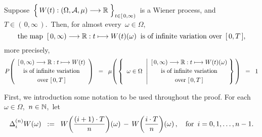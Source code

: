 
\vskip 0.5cm
\begin{theorem}
\label{WienerProcessHasInfiniteVariationSamplePaths}
\mbox{}
\vskip 0.2cm
\noindent
Suppose
\,$\left\{\,\overset{{\color{white}.}}{W}(t) : (\Omega,\mathcal{A},\mu) \longrightarrow \Re \;\right\}_{t \in[\,0,\infty)}$\,
is a Wiener process,
and \,$T \in (\,0,\infty\,)$.\,
Then, for almost every \,$\omega \in \Omega$,
\begin{equation*}
\textnormal{the map}\;\;
[\,0,\infty) \longrightarrow \Re : t \longmapsto W(t)(\omega)
\;\;\textnormal{is of infinite variation over \,$[\,0,T\,]$},
\end{equation*}
more precisely,
\begin{equation*}
P\!\left(
	\begin{array}{c}
	[\,0,\infty) \longrightarrow \Re : t \longmapsto W(t)
	\\
	\overset{{\color{white}.}}{\textnormal{is of infinite variation}}
	\\
	\overset{{\color{white}.}}{\textnormal{over $[\,0,T\,]$}}
	\end{array}
	\right)
\;\; = \;\;
	\mu\!\left(\,\left\{\;\;
		\omega \in \Omega
		\,\;\left\vert
		\begin{array}{c}
			[\,0,\infty) \longrightarrow \Re : t \longmapsto W(t)(\omega)
			\\
			\overset{{\color{white}.}}{\textnormal{is of infinite variation}}
			\\
			\overset{{\color{white}.}}{\textnormal{over $[\,0,T\,]$}}
			\end{array}
			\right.
		\!\!\right\}\,\right)
\;\; = \;\;
	1
\end{equation*}
\end{theorem}
\proof
First, we introduction some notation to be used throughout the proof.
For each \,$\omega \in \Omega$, \,$n \in \N$,\, let
\begin{equation*}
\Delta^{(n)}_{i}W(\omega)
\;\; := \;\;
	W\!\left(\frac{(i+1) \cdot T}{n}\right)\!(\omega)
	\,-\,
	W\!\left(\frac{i \cdot T}{n}\right)\!(\omega)\,,
\quad
\textnormal{for \,$i = 0, 1, \ldots, n-1$}.
\end{equation*}

